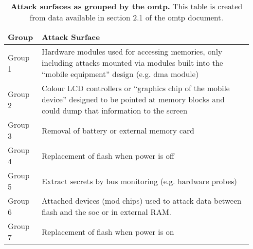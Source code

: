 \begin{table}[htb]
\centering
\begin{tabular}{|p{2cm}|p{12cm}|}
\hline
\textbf{Group} & \textbf{Attack Surface} \\ \hline
Group 1 & Hardware modules used for accessing memories, only including attacks mounted via modules built into the ``mobile equipment'' design (e.g. \gls{dma} module) \\ \hline
Group 2 & Colour LCD controllers or ``graphics chip of the mobile device'' designed to be pointed at memory blocks and could dump that information to the screen\\ \hline
Group 3 & Removal of battery or external memory card \\ \hline
Group 4 & Replacement of flash when power is off \\ \hline
Group 5 & Extract secrets by bus monitoring (e.g. hardware probes) \\ \hline
Group 6 & Attached devices (mod chips) used to attack data between flash and the \gls{soc} or in external RAM. \\ \hline
Group 7 & Replacement of flash when power is on \\ \hline
\end{tabular}
\caption[OMTP Threat Groups]{\textbf{Attack surfaces as grouped by the \gls{omtp}.} This table is created from data available in section 2.1 of the \gls{omtp} document. \cite{Confidential2009}}
\label{table:omtp_threat_groups}
\end{table}
